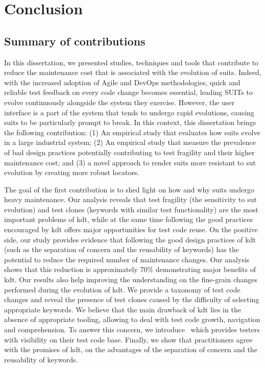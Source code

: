\chapter{Conclusion}
\label{chap:conclusion}

\section{Summary of contributions}

In this dissertation, we presented studies, techniques and tools that contribute to reduce the maintenance cost that is associated with the evolution of \gls{suit}s. Indeed, with the increased adoption of Agile and DevOps methodologies, quick and reliable test feedback on every code change becomes essential, leading SUITs to evolve continuously alongside the system they exercise. However,  the user interface is a part of the system that tends to undergo rapid evolutions, causing \gls{suit}s to be particularly prompt to break. In this context, this dissertation brings the following contribution: (1) An empirical study that evaluates how \gls{suit}s evolve in a large industrial system; (2) An empirical study that measure the prevalence of bad design practices potentially contributing to test fragility and their higher maintenance cost; and (3) a novel approach to render \gls{suit}s more resistant to \gls{sut} evolution by creating more robust locators.

The goal of the first contribution is to shed light on how and why \gls{suit}s undergo heavy maintenance. Our analysis reveals that test fragility (the sensitivity to \gls{sut} evolution) and test clones (keywords with similar test functionality) are the most important problems of \gls{kdt}, while at the same time following the good practices encouraged by \gls{kdt} offers major opportunities for test code reuse. On the positive side, our study provides evidence that following the good design practices of \gls{kdt} (such as  the  separation of concern and the reusability of keywords) has the potential to reduce the required number of maintenance changes. Our analysis shows that this reduction is approximately 70\% demonstrating major benefits of \gls{kdt}. Our results also help improving the understanding on the fine-grain changes performed during the evolution of \gls{kdt}.  We provide a taxonomy of test code changes and reveal the presence of test clones caused by the difficulty of selecting appropriate keywords. We believe that the main drawback of \gls{kdt} lies in the absence of appropriate tooling, allowing to deal with test code growth, navigation and comprehension. To answer this concern, we introduce \tool\ which provides testers with visibility on their test code base. Finally, we show that practitioners agree with the promises of \gls{kdt}, on the advantages of the separation of concern and the reusability of keywords. 

